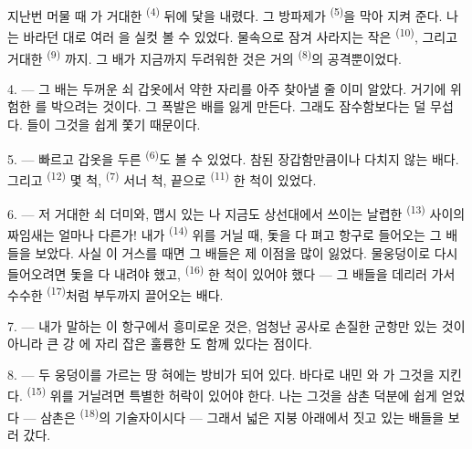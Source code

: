 지난번 머물 때 가 거대한  \textsuperscript{(4)} 뒤에 닻을
내렸다. 그 방파제가  \textsuperscript{(5)}을 막아 지켜 준다. 나는 바라던
대로 여러 을 실컷 볼 수 있었다. 물속으로 잠겨 사라지는 작은
 \textsuperscript{(10)}, 그리고 거대한  \textsuperscript{(9)}
까지. 그 배가 지금까지 두려워한 것은 거의  \textsuperscript{(8)}의 공격뿐이었다.

\VUsaut{3.0mm}
\VUsaut{3.0mm}

4. --- 그 배는 두꺼운 쇠 갑옷에서 약한 자리를 아주  찾아낼 줄 이미
알았다. 거기에 위험한 를 박으려는 것이다. 그 폭발은 배를 잃게 만든다.
그래도 잠수함보다는 덜 무섭다. 들이 그것을 쉽게 쫓기 때문이다.

5. --- 빠르고 갑옷을 두른  \textsuperscript{(6)}도 볼 수 있었다. 참된
장갑함만큼이나 다치지 않는 배다. 그리고  \textsuperscript{(12)} 몇 척,
 \textsuperscript{(7)} 서너 척, 끝으로  \textsuperscript{(11)} 한
척이 있었다.

6. --- 저 거대한 쇠 더미와, 맵시 있는 나 지금도 상선대에서 쓰이는
날렵한  \textsuperscript{(13)} 사이의 짜임새는 얼마나 다른가! 내가
 \textsuperscript{(14)} 위를 거닐 때, 돛을 다 펴고 항구로 들어오는 그 배들을
보았다. 사실 이 거스를 때면 그 배들은 제 이점을 많이 잃었다. 물웅덩이로
다시 들어오려면 돛을 다 내려야 했고,  \textsuperscript{(16)} 한 척이 있어야
했다 — 그 배들을 데리러 가서 수수한  \textsuperscript{(17)}처럼 부두까지
끌어오는 배다.

\VUsaut{3.0mm}
\VUsaut{3.0mm}

7. --- 내가 말하는 이 항구에서 흥미로운 것은, 엄청난 공사로 손질한 군항만 있는 것이
아니라 큰 강 에 자리 잡은 훌륭한 도 함께 있다는 점이다.

8. --- 두 웅덩이를 가르는 땅 혀에는 방비가 되어 있다. 바다로 내민 와
가 그것을 지킨다.  \textsuperscript{(15)} 위를 거닐려면 특별한
허락이 있어야 한다. 나는 그것을 삼촌 덕분에 쉽게 얻었다 — 삼촌은 
\textsuperscript{(18)}의 기술자이시다 — 그래서 넓은 지붕 아래에서 짓고 있는 배들을 보러
갔다.

